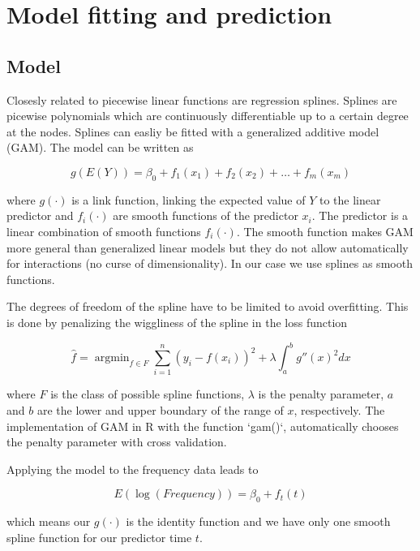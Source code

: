 \documentclass{article}\usepackage[]{graphicx}\usepackage[]{color}
\DeclareMathOperator*{\argmin}{argmin}
\begin{document}
\section{Model fitting and prediction}

\subsection{Model}

Closesly related to piecewise linear functions are regression splines. Splines are picewise polynomials which are continuously differentiable up to a certain degree at the nodes. Splines can easliy be fitted with a generalized additive model (GAM). The model can be written as

\begin{equation}
g(E(Y)) = \beta_0 + f_1(x_1) + f_2(x_2) + \dots + f_m(x_m)
\end{equation}

where $g(\cdot)$ is a link function, linking the expected value of $Y$ to the linear predictor and $f_i(\cdot)$ are smooth functions of the predictor $x_i$. The predictor is a linear combination of smooth functions $f_i(\cdot)$. The smooth function makes GAM more general than generalized linear models but they do not allow automatically for interactions (no curse of dimensionality). In our case we use splines as smooth functions.

The degrees of freedom of the spline have to be limited to avoid overfitting. This is done by penalizing the wiggliness of the spline in the loss function

\begin{equation}
\hat{f} = \argmin_{f \in F} \sum_{i=1}^n(y_i - f(x_i))^2 + \lambda \int_{a}^bg''(x)^2 dx
\end{equation}

where $F$ is the class of possible spline functions, $\lambda$ is the penalty parameter, $a$ and $b$ are the lower and upper boundary of the range of $x$, respectively. The implementation of GAM in R with the function `gam()`, automatically chooses the penalty parameter with cross validation.

Applying the model to the frequency data leads to

\begin{equation}
E(\log(Frequency)) = \beta_0 + f_{t}(t)
\end{equation}

which means our $g(\cdot)$ is the identity function and we have only one smooth spline function for our predictor time $t$.
\end{document}
